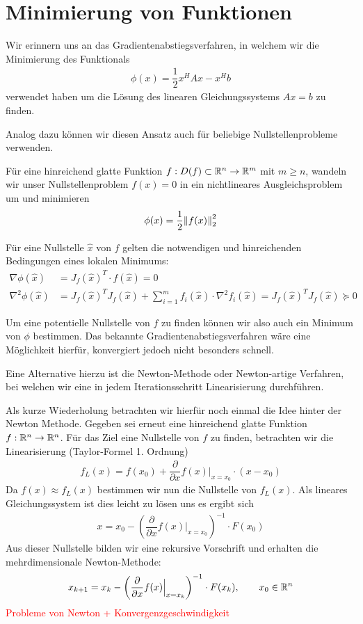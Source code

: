 
\section{Minimierung von Funktionen}
Wir erinnern uns an das Gradientenabstiegsverfahren, in welchem wir die Minimierung des Funktionals 
%
\begin{align*}
  \phi(x) = \dfrac{1}{2}x^HAx - x^Hb 
\end{align*}
%
verwendet haben um die Lösung des linearen Gleichungssystems $Ax=b$ zu finden. 

Analog dazu können wir diesen Ansatz auch für beliebige Nullstellenprobleme verwenden. 

Für eine hinreichend glatte Funktion $f:D(f)\subset \mathbb R^n\to\mathbb R^m$ mit $m\geq n$, 
wandeln wir unser Nullstellenproblem $f(x)=0$ in ein nichtlineares Ausgleichsproblem um und minimieren 
%
\begin{align*}
  \phi(x) = \dfrac{1}{2}\vertn{2}{f(x)}_2^2
\end{align*}

Für eine Nullstelle $\hat{x}$ von $f$ gelten die notwendigen und hinreichenden Bedingungen eines lokalen Minimums:
%
\begin{align*}
  \nabla \phi(\hat{x}) 
  &= J_f(\hat{x})^T \cdot f(\hat{x}) = 0\\
  \nabla^2 \phi(\hat{x}) 
  &= J_f(\hat{x})^TJ_f(\hat{x}) + \sum_{i=1}^{m} f_i(\hat{x})\cdot \nabla^2 f_i(\hat{x}) 
  = J_f(\hat{x})^TJ_f(\hat{x}) \succeq 0
\end{align*}
%

Um eine potentielle Nullstelle von $f$ zu finden können wir also auch ein Minimum von $\phi$ bestimmen. Das 
bekannte Gradientenabstiegsverfahren wäre eine Möglichkeit hierfür, konvergiert jedoch nicht besonders schnell.

Eine Alternative hierzu ist die Newton-Methode oder Newton-artige Verfahren, bei welchen wir eine in jedem 
Iterationsschritt Linearisierung durchführen.

Als kurze Wiederholung betrachten wir hierfür noch einmal die Idee hinter der Newton Methode. Gegeben sei erneut 
eine hinreichend glatte Funktion $f:\mathbb R^n\to\mathbb R^n$. Für das Ziel eine Nullstelle von $f$ zu finden, betrachten wir 
die Linearisierung (Taylor-Formel 1. Ordnung)
%
\begin{align*}
  f_L(x) = f(x_0) + \dfrac{\partial }{\partial x} f(x) \Big|_{x=x_0}\cdot (x-x_0)
\end{align*}
%
Da $f(x) \approx f_L(x)$ bestimmen wir nun die Nullstelle von $f_L(x)$. Als lineares Gleichungssystem ist dies leicht 
zu lösen uns es ergibt sich 
%
\begin{align*}
  x = x_0 - \left(\dfrac{\partial }{\partial x} f(x) \Big|_{x=x_0}\right)^{-1}\cdot F(x_0)
\end{align*}
%
Aus dieser Nullstelle bilden wir eine rekursive Vorschrift und erhalten die mehrdimensionale Newton-Methode:
%
\begin{align*}
  x_{k+1} = x_k - \left(\dfrac{\partial }{\partial x} f(x) \Big|_{x=x_k}\right)^{-1}\cdot F(x_k),
  \qquad x_0\in\mathbb R^n
\end{align*}
%
\textcolor{red}{Probleme von Newton + Konvergenzgeschwindigkeit}

